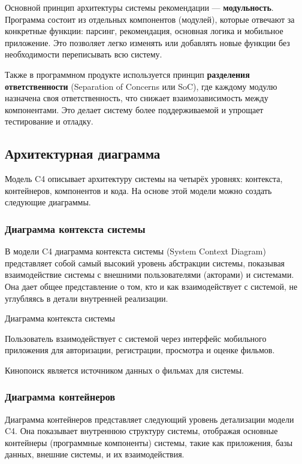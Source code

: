 Основной принцип архитектуры системы рекомендации
--- \textbf{модульность}.
Программа состоит из отдельных компонентов (модулей),
которые отвечают за конкретные функции:
парсинг, рекомендация, основная логика и мобильное приложение.
Это позволяет легко изменять или добавлять новые функции
без необходимости переписывать всю систему.\par
Также в программном продукте используется принцип
\textbf{разделения ответственности}
(Separation of Concerns или SoC), где каждому модулю назначена
своя ответственность, что снижает взаимозависимость между компонентами.
Это делает систему более поддерживаемой и упрощает тестирование и отладку.

\subsection{Архитектурная диаграмма}

Модель C4 описывает архитектуру системы на четырёх уровнях:
контекста, контейнеров, компонентов и кода.
На основе этой модели можно создать следующие диаграммы.


\subsubsection{Диаграмма контекста системы}
В модели C4 диаграмма контекста системы (System Context Diagram)
представляет собой самый высокий уровень абстракции системы,
показывая взаимодействие системы с внешними пользователями (акторами)
и системами.
Она дает общее представление о том,
кто и как взаимодействует с системой,
не углубляясь в детали внутренней реализации.

\begin{image}
	\caption{Диаграмма контекста системы}
	\label{fig:c4:system:context1}
\end{image}

Пользователь взаимодействует с системой через интерфейс мобильного приложения для авторизации, регистрации, просмотра и
оценке фильмов.\par
Кинопоиск является источником данных о фильмах для системы.
\clearpage

\subsubsection{Диаграмма контейнеров}

Диаграмма контейнеров представляет следующий уровень детализации модели C4.
Она показывает внутреннюю структуру системы,
отображая основные контейнеры (программные компоненты) системы,
такие как приложения, базы данных, внешние системы, и их взаимодействия.

